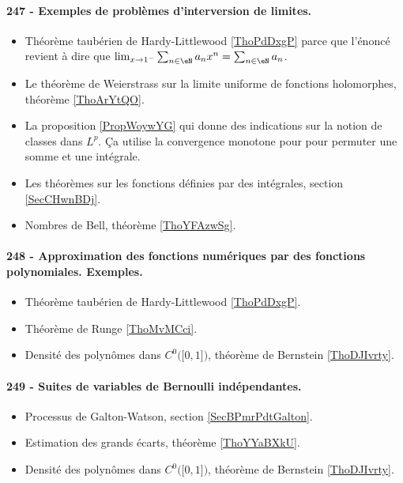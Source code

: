 \paragraph{247 - Exemples de problèmes d’interversion de limites.}
\begin{itemize}
    \item Théorème taubérien de Hardy-Littlewood \ref{ThoPdDxgP} parce que l'énoncé revient à dire que \( \lim_{x\to 1^-} \sum_{n\in \eN}a_nx^n=\sum_{n\in \eN}a_n\).
    \item Le théorème de Weierstrass sur la limite uniforme de fonctions holomorphes, théorème \ref{ThoArYtQO}.
    \item La proposition \ref{PropWoywYG} qui donne des indications sur la notion de classes dans \( L^p\). Ça utilise la convergence monotone pour  pour permuter une somme et une intégrale.
    \item Les théorèmes sur les fonctions définies par des intégrales, section \ref{SecCHwnBDj}.
    \item Nombres de Bell, théorème \ref{ThoYFAzwSg}.
\end{itemize}
\paragraph{248 - Approximation des fonctions numériques par des fonctions polynomiales. Exemples.}
\begin{itemize}
    \item Théorème taubérien de Hardy-Littlewood \ref{ThoPdDxgP}.
    \item Théorème de Runge \ref{ThoMvMCci}.
    \item Densité des polynômes dans \( C^0\big( \mathopen[ 0 , 1 \mathclose] \big)\), théorème de Bernstein \ref{ThoDJIvrty}.
\end{itemize}
\paragraph{249 - Suites de variables de Bernoulli indépendantes.}
\begin{itemize}
    \item Processus de Galton-Watson, section \ref{SecBPmrPdtGalton}.
    \item Estimation des grands écarts, théorème \ref{ThoYYaBXkU}.
    \item Densité des polynômes dans \( C^0\big( \mathopen[ 0 , 1 \mathclose] \big)\), théorème de Bernstein \ref{ThoDJIvrty}.
\end{itemize}
